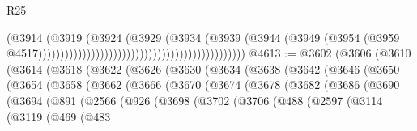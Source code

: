 \begin{lexlean}{R25}
\begin{coremodule}
{{{{{{{{{{{{{{{{{{{{{{{{{{{{{{{{{{{{{{{{{{{{{{{{{{{{{{{{{{{{{{{{{{{{{{{{{{{{{{{{{{{{{{{{{{{{{{{{{{{{{{{{{{{{{{{{{{{{{{{{{{{{{{{{{{{{{{{{{{{{{{{{{{{{{{{{{{{{{{{{{{{{{{{{{{{{{{{{{{{{{{{{{{{{{{{{{{{{{{{                                                                              (@3914
                                                                                (@3919
                                                                                  (@3924
                                                                                    (@3929
                                                                                      (@3934
                                                                                        (@3939
                                                                                          (@3944
                                                                                            (@3949
                                                                                              (@3954
                                                                                                (@3959
                                                                                                  @4517)))))))))))))))))))))))))))))))))))))))))))))))
@4613 := @3602
    (@3606
      (@3610
        (@3614
          (@3618
            (@3622
              (@3626
                (@3630
                  (@3634
                    (@3638
                      (@3642
                        (@3646
                          (@3650
                            (@3654
                              (@3658
                                (@3662
                                  (@3666
                                    (@3670
                                      (@3674
                                        (@3678
                                          (@3682
                                            (@3686
                                              (@3690
                                                (@3694
                                                  (@891
                                                    (@2566
                                                      (@926
                                                        (@3698
                                                          (@3702
                                                            (@3706
                                                              (@488
                                                                (@2597
                                                                  (@3114
                                                                    (@3119
                                                                      (@469
                                                                        (@483
}}}}}}}}}}}}}}}}}}}}}}}}}}}}}}}}}}}}}}}}}}}}}}}}}}}}}}}}}}}}}}}}}}}}}}}}}}}}}}}}}}}}}}}}}}}}}}}}}}}}}}}}}}}}}}}}}}}}}}}}}}}}}}}}}}}}}}}}}}}}}}}}}}}}}}}}}}}}}}}}}}}}}}}}}}}}}}}}}}}}}}}}}}}}}}}}}}}}}}}
\end{coremodule}
\end{lexlean}
